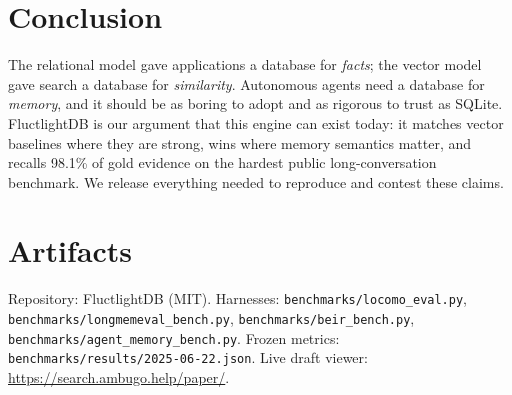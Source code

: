 \documentclass[11pt]{article}
\begin{document}
\section{Conclusion}
The relational model gave applications a database for \emph{facts}; the vector
model gave search a database for \emph{similarity}. Autonomous agents need a
database for \emph{memory}, and it should be as boring to adopt and as rigorous to
trust as SQLite. FluctlightDB is our argument that this engine can exist today: it
matches vector baselines where they are strong, wins where memory semantics
matter, and recalls 98.1\% of gold evidence on the hardest public long-conversation
benchmark. We release everything needed to reproduce and contest these claims.

\section*{Artifacts}
Repository: FluctlightDB (MIT). Harnesses: \texttt{benchmarks/locomo\_eval.py},
\texttt{benchmarks/longmemeval\_bench.py}, \texttt{benchmarks/beir\_bench.py},
\texttt{benchmarks/agent\_memory\_bench.py}. Frozen metrics:
\texttt{benchmarks/results/2025-06-22.json}. Live draft viewer:
\url{https://search.ambugo.help/paper/}.



\end{document}
